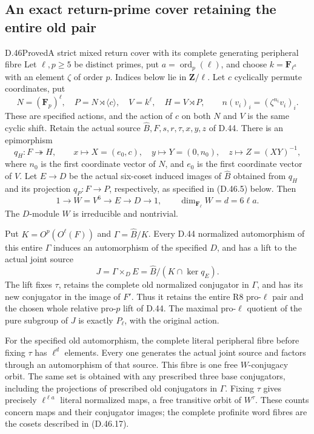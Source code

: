\subsection{An exact return-prime cover retaining the entire old pair}

\begin{statement}{D.46}{Proved}{A strict mixed return cover with its complete generating peripheral fibre}
Let \(\ell,p\geq5\) be distinct primes, put
\(a=\operatorname{ord}_p(\ell)\), and choose
\(k=\mathbf F_{\ell^a}\) with an element \(\zeta\) of order \(p\).
Indices below lie in \(\mathbf Z/\ell\).
Let \(c\) cyclically permute coordinates, put
\[
 N=(\mathbf F_p)^\ell,\quad
 P=N\rtimes\langle c\rangle,\quad
 V=k^\ell,\quad H=V\rtimes P,
 \qquad
 n(v_i)_i=(\zeta^{n_i}v_i)_i.
 \tag{D.46.1}
\]
These are specified actions, and the action of \(c\) on both
\(N\) and \(V\) is the same cyclic shift.
Retain the actual source \(\widehat B,F,s,r,\tau,x,y,z\) of D.44.
There is an epimorphism
\[
 q_H:F\twoheadrightarrow H,
 \qquad x\longmapsto X=(e_0,c),\quad
 y\longmapsto Y=(0,n_0),\quad z\longmapsto Z=(XY)^{-1},
 \tag{D.46.2}
\]
where \(n_0\) is the first coordinate vector of \(N\), and
\(e_0\) is the first coordinate vector of \(V\).
Let \(E\to D\) be the actual six-coset induced images of
\(\widehat B\) obtained from \(q_H\) and its projection
\(q_P:F\to P\), respectively, as specified in
\textup{(D.46.5)} below. Then
\[
 1\longrightarrow W=V^6\longrightarrow E\longrightarrow D
 \longrightarrow1,
 \qquad \dim_{\mathbf F_\ell}W=d=6\ell a.
 \tag{D.46.3}
\]
The \(D\)-module \(W\) is irreducible and nontrivial.

Put \(K=O^p(O^\ell(F))\) and
\(\Gamma=\widehat B/K\).
Every D.44 normalized automorphism of this entire \(\Gamma\)
induces an automorphism of the specified \(D\), and has a lift
to the actual joint source
\[
 J=\Gamma\mathbin{\times_D}E
   =\widehat B/(K\cap\ker q_E).
 \tag{D.46.4}
\]
The lift fixes \(\tau\), retains the complete old normalized
conjugator in \(\Gamma\), and has its new conjugator in the
image of \(F'\). Thus it retains the entire R8 pro-\(\ell\)
pair and the chosen whole relative pro-\(p\) lift of D.44.
The maximal pro-\(\ell\) quotient of the pure subgroup of
\(J\) is exactly \(P_\ell\), with the original action.

For the specified old automorphism, the complete literal
peripheral fibre before fixing \(\tau\) has \(\ell^d\)
elements. Every one generates the actual joint source and
factors through an automorphism of that source.
This fibre is one free \(W\)-conjugacy orbit.
The same set is obtained with any prescribed three base
conjugators, including the projections of prescribed old
conjugators in \(\Gamma\).
Fixing \(\tau\) gives precisely
\(\ell^{\ell a}\) literal normalized maps, a free transitive
orbit of \(W^\tau\). These counts concern maps and their
conjugator images; the complete profinite word fibres are
the cosets described in \textup{(D.46.17)}.


\end{statement}
